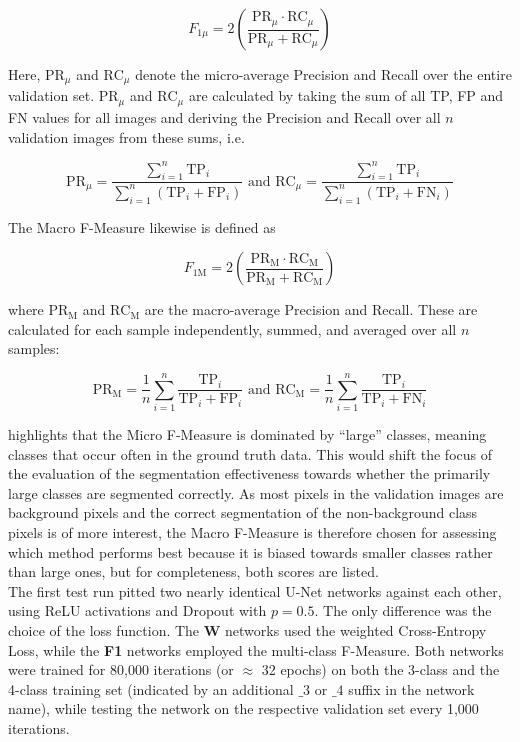 \[ F_{1\mu} = 2 \left ( \frac{\text{PR}_\mu \cdot \text{RC}_\mu}{\text{PR}_\mu + \text{RC}_\mu} \right ) \]

\noindent Here, $\text{PR}_\mu$ and $\text{RC}_\mu$ denote the micro-average Precision and Recall over the entire validation set. $\text{PR}_\mu$ and $\text{RC}_\mu$ are calculated by taking the sum of all TP, FP and FN values for all images and deriving the Precision and Recall over all $n$ validation images from these sums, i.e.

\[ \text{PR}_\mu = \frac{\sum_{i=1}^{n}\text{TP}_i}{\sum_{i=1}^{n} (\text{TP}_i + \text{FP}_i)} \text{ and }  \text{RC}_\mu = \frac{\sum_{i=1}^{n} \text{TP}_i}{\sum_{i=1}^{n} (\text{TP}_i + \text{FN}_i)} \]

\noindent The Macro F-Measure likewise is defined as

\[ F_{\text{1M}} = 2 \left ( \frac{\text{PR}_\text{M} \cdot \text{RC}_\text{M}}{\text{PR}_\text{M} + \text{RC}_\text{M}} \right ) \]

\noindent where $\text{PR}_\text{M}$ and $\text{RC}_\text{M}$ are the macro-average Precision and Recall. These are calculated for each sample independently, summed, and averaged over all $n$ samples:

\[ \text{PR}_\text{M} = \frac{1}{n} \sum_{i=1}^{n} \frac{\text{TP}_i}{\text{TP}_i + \text{FP}_i} \text { and } \text{RC}_\text{M} = \frac{1}{n} \sum_{i=1}^{n} \frac{\text{TP}_i}{\text{TP}_i + \text{FN}_i} \] 

\noindent \cite[pp. 317-318]{information_retrieval} highlights that the Micro F-Measure is dominated by ``large'' classes, meaning classes that occur often in the ground truth data. This would shift the focus of the evaluation of the segmentation effectiveness towards whether the primarily large classes are segmented correctly. As most pixels in the validation images are background pixels and the correct segmentation of the non-background class pixels is of more interest, the Macro F-Measure is therefore chosen for assessing which method performs best because it is biased towards smaller classes rather than large ones, but for completeness, both scores are listed.\\

\noindent The first test run pitted two nearly identical U-Net networks against each other, using ReLU activations and Dropout with $p = 0.5$. The only difference was the choice of the loss function. The \textbf{W} networks used the weighted Cross-Entropy Loss, while the \textbf{F1} networks employed the multi-class F-Measure. Both networks were trained for 80,000 iterations (or $\approx$ 32 epochs) on both the 3-class and the 4-class training set (indicated by an additional $\_3$ or $\_4$ suffix in the network name), while testing the network on the respective validation set every 1,000 iterations.


